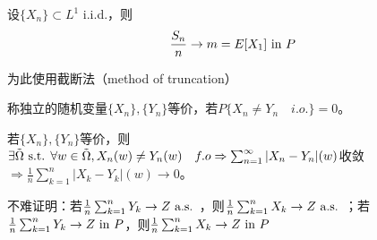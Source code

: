 \documentclass{ctexbook}
\begin{document}
\begin{Thm}
  设$\{X_{n}\}\subset L^{1}$ i.i.d.，则
  \[\frac{S_{n}}{n}\to m=E[X_{1}]\text{ in } P\]
\end{Thm}
为此使用截断法（method of truncation）

\begin{Def}
  称独立的随机变量$\{X_{n}\},\{Y_{n}\}$等价，若$P\{X_{n}\neq Y_n\quad i.o.\}=0$。
\end{Def}
若$\{X_{n}\},\{Y_{n}\}$等价，则$\exists \tilde{\Omega}\text{ s.t. } \forall w\in \tilde\Omega, X_{n}(w)\neq Y_{n}(w) \quad f.o\Rightarrow \sum_{n=1}^{\infty}|X_{n}-Y_{n}|(w)$收敛$\Rightarrow \frac{1}{n}\sum_{k=1}^{n}|X_{k}-Y_{k}|(w)\to 0$。

不难证明：若$\frac{1}{n}\sum_{k=1}^{n}Y_{k}\to Z\text{ a.s. }$，则$\frac{1}{n}\sum_{k=1}^{n}X_{k}\to Z\text{ a.s. }$；若$\frac{1}{n}\sum_{k=1}^{n}Y_{k}\to Z\text{ in } P$，则$\frac{1}{n}\sum_{k=1}^{n}X_{k}\to Z\text{ in } P$
\end{document}
